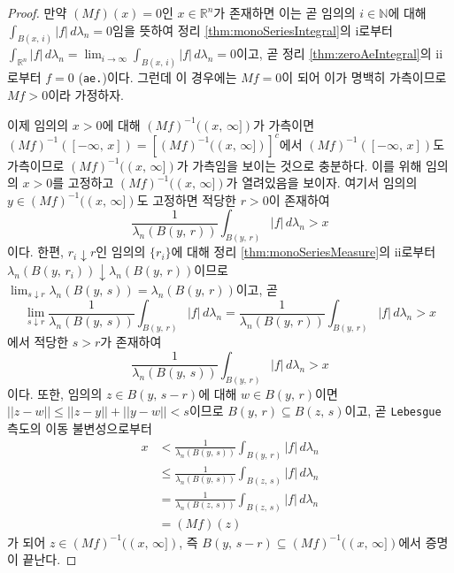 \begin{proof}
    만약 $(Mf)(x)=0$인 $x\in\mathbb{R}^n$가 존재하면 이는 곧 임의의 $i\in\mathbb{N}$에 대해 $\int_{B(x,\,i)}|f|\,d\lambda_n=0$임을 뜻하여 정리 \ref{thm:monoSeriesIntegral}의 i로부터 $\int_{\mathbb{R}^n}|f|\,d\lambda_n=\lim_{i\to\infty}\int_{B(x,\,i)}|f|\,d\lambda_n=0$이고, 곧 정리 \ref{thm:zeroAeIntegral}의 ii로부터 $f=0$ (\texttt{ae.})이다. 그런데 이 경우에는 $Mf=0$이 되어 이가 명백히 가측이므로 $Mf>0$이라 가정하자.

    이제 임의의 $x>0$에 대해 $(Mf)^{-1}((x,\,\infty])$가 가측이면 $(Mf)^{-1}([-\infty,\,x])=[(Mf)^{-1}((x,\,\infty])]^c$에서 $(Mf)^{-1}([-\infty,\,x])$도 가측이므로 $(Mf)^{-1}((x,\,\infty])$가 가측임을 보이는 것으로 충분하다. 이를 위해 임의의 $x>0$를 고정하고 $(Mf)^{-1}((x,\,\infty])$가 열려있음을 보이자. 여기서 임의의 $y\in(Mf)^{-1}((x,\,\infty])$도 고정하면 적당한 $r>0$이 존재하여
    \begin{equation*}
        \frac{1}{\lambda_n(B(y,\,r))}\int_{B(y,\,r)}|f|\,d\lambda_n>x
    \end{equation*}
    이다. 한편, $r_i\downarrow r$인 임의의 $\{r_i\}$에 대해 정리 \ref{thm:monoSeriesMeasure}의 ii로부터 $\lambda_n(B(y,\,r_i))\downarrow\lambda_n(B(y,\,r))$이므로 $\lim_{s\downarrow r}\lambda_n(B(y,\,s))=\lambda_n(B(y,\,r))$이고, 곧
    \begin{equation*}
        \lim_{s\downarrow r}\frac{1}{\lambda_n(B(y,\,s))}\int_{B(y,\,r)}|f|\,d\lambda_n=\frac{1}{\lambda_n(B(y,\,r))}\int_{B(y,\,r)}|f|\,d\lambda_n>x
    \end{equation*}
    에서 적당한 $s>r$가 존재하여
    \begin{equation*}
        \frac{1}{\lambda_n(B(y,\,s))}\int_{B(y,\,r)}|f|\,d\lambda_n>x
    \end{equation*}
    이다. 또한, 임의의 $z\in B(y,\,s-r)$에 대해 $w\in B(y,\,r)$이면 $||z-w||\leq||z-y||+||y-w||<s$이므로 $B(y,\,r)\subseteq B(z,\,s)$이고, 곧 \texttt{Lebesgue} 측도의 이동 불변성으로부터
    \begin{align*}
        x&<\frac{1}{\lambda_n(B(y,\,s))}\int_{B(y,\,r)}|f|\,d\lambda_n\\
        &\leq\frac{1}{\lambda_n(B(y,\,s))}\int_{B(z,\,s)}|f|\,d\lambda_n\\
        &=\frac{1}{\lambda_n(B(z,\,s))}\int_{B(z,\,s)}|f|\,d\lambda_n\\
        &=(Mf)(z)
    \end{align*}
    가 되어 $z\in(Mf)^{-1}((x,\,\infty])$, 즉 $B(y,\,s-r)\subseteq(Mf)^{-1}((x,\,\infty])$에서 증명이 끝난다.
\end{proof}

